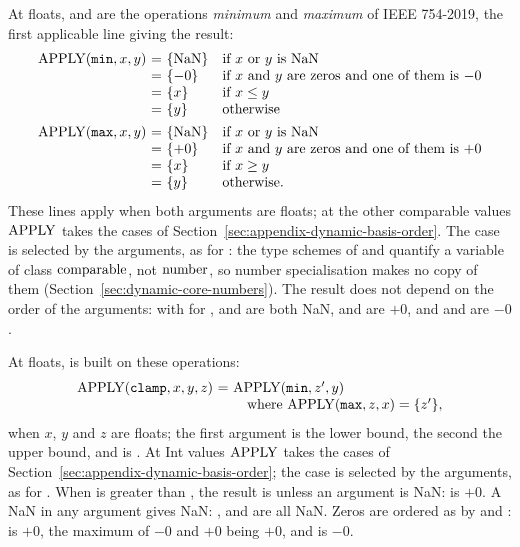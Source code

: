 At floats,  and  are the operations \emph{minimum} and
\emph{maximum} of IEEE 754-2019, the first applicable line giving the
result: %
\[
\begin{array}{@{}r@{\ }c@{\ }l@{\quad}l@{}}
\APPLY(\kw{min},x,y) & = & \{\dbNaN\} & \text{if}\ x\ \text{or}\ y\ \text{is}\ \dbNaN\\
                     & = & \{-0\} & \text{if}\ x\ \text{and}\ y\ \text{are zeros and one of them is}\ {-0}\\
                     & = & \{x\} & \text{if}\ x\leq y\\
                     & = & \{y\} & \text{otherwise}\\[1ex]
\APPLY(\kw{max},x,y) & = & \{\dbNaN\} & \text{if}\ x\ \text{or}\ y\ \text{is}\ \dbNaN\\
                     & = & \{+0\} & \text{if}\ x\ \text{and}\ y\ \text{are zeros and one of them is}\ {+0}\\
                     & = & \{x\} & \text{if}\ x\geq y\\
                     & = & \{y\} & \text{otherwise}.
\end{array}
\]
These lines apply when both arguments are floats; at the other comparable
values $\mathrm{APPLY}$ takes the cases of
Section~\ref{sec:appendix-dynamic-basis-order}. The case is selected by the
arguments, as for : the type schemes of  and 
quantify a variable of class $\mathrm{comparable}$, not $\mathrm{number}$, so number
specialisation makes no copy of them
(Section~\ref{sec:dynamic-core-numbers}). The result does not depend
on the order of the arguments: with  for , 
and  are both NaN,  and  are $+0$,
and  and  are $-0$. %

At floats,  is built on these operations: %
\[
\begin{array}{@{}r@{\ }c@{\ }l@{\quad}l@{}}
\APPLY(\kw{clamp},x,y,z) & = & \APPLY(\kw{min},z',y) &\\
 & & \multicolumn{2}{@{}l@{}}{\quad\text{where}\ \APPLY(\kw{max},z,x)=\{z'\},}
\end{array}
\]
when $x$, $y$ and $z$ are floats; the first argument is the lower bound,
the second the upper bound, and  is
. At Int values $\mathrm{APPLY}$ takes the cases of
Section~\ref{sec:appendix-dynamic-basis-order}; the case is selected by the
arguments, as for . When  is greater than , the
result is  unless an argument is NaN:  is $+0$.
A NaN in any argument gives NaN: , 
and  are all NaN. Zeros are ordered as by
 and :  is $+0$, the maximum of $-0$ and
$+0$ being $+0$, and  is $-0$.

